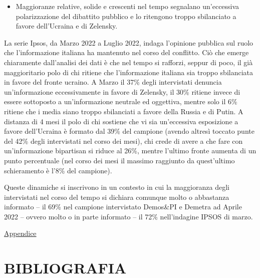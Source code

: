 \documentclass[
]{book}
\providecommand{\tightlist}{%
  \setlength{\itemsep}{0pt}\setlength{\parskip}{0pt}}
\begin{document}
\begin{itemize}
\tightlist
\item
  Maggioranze relative, solide e crescenti nel tempo segnalano un'eccessiva polarizzazione del dibattito pubblico e lo ritengono troppo sbilanciato a favore dell'Ucraina e di Zelensky.
\end{itemize}

La serie Ipsos, da Marzo 2022 a Luglio 2022, indaga l'opinione pubblica sul ruolo che l'informazione italiana ha mantenuto nel corso del conflitto. Ciò che emerge chiaramente dall'analisi dei dati è che nel tempo si rafforzi, seppur di poco, il già maggioritario polo di chi ritiene che l'informazione italiana sia troppo sbilanciata in favore del fronte ucraino. A Marzo il 37\% degli intervistati denuncia un'informazione eccessivamente in favore di Zelensky, il 30\% ritiene invece di essere sottoposto a un'informazione neutrale ed oggettiva, mentre solo il 6\% ritiene che i media siano troppo sbilanciati a favore della Russia e di Putin. A distanza di 4 mesi il polo di chi sostiene che vi sia un'eccessiva esposizione a favore dell'Ucraina è formato dal 39\% del campione (avendo altresì toccato punte del 42\% degli intervistati nel corso dei mesi), chi crede di avere a che fare con un'informazione bipartisan si riduce al 26\%, mentre l'ultimo fronte aumenta di un punto percentuale (nel corso dei mesi il massimo raggiunto da quest'ultimo schieramento è l'8\% del campione).

Queste dinamiche si inscrivono in un contesto in cui la maggioranza degli intervistati nel corso del tempo si dichiara comunque molto o abbastanza informato -- il 69\% nel campione intervistato Demos\&PI e Demetra ad Aprile 2022 -- ovvero molto o in parte informato -- il 72\% nell'indagine IPSOS di marzo.

\href{https://github.com/LucianaFazio/Ucrania/blob/main/PDF_Appendice/VIII.\%20Ruolo\%20dei\%20media.pdf}{Appendice}

\hypertarget{bibliografia}{%
\chapter*{BIBLIOGRAFIA}\label{bibliografia}}

  
\end{document}
